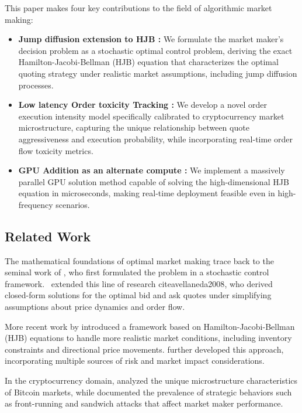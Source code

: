 \documentclass[twocolumn,11pt]{IEEEtran}  %
\begin{document}
This paper makes four key contributions to the field of algorithmic market making:

\begin{itemize}
    \item \textbf {Jump diffusion extension to HJB : } We formulate the market maker's decision problem as a stochastic optimal control problem, deriving the exact Hamilton-Jacobi-Bellman (HJB) equation that characterizes the optimal quoting strategy under realistic market assumptions, including jump diffusion processes.
    
    \item \textbf{Low latency Order toxicity Tracking : } We develop a novel order execution intensity model specifically calibrated to cryptocurrency market microstructure, capturing the unique relationship between quote aggressiveness and execution probability, while incorporating real-time order flow toxicity metrics.
    
    \item \textbf{ GPU Addition as an alternate compute : }We implement a massively parallel GPU solution method capable of solving the high-dimensional HJB equation in microseconds, making real-time deployment feasible even in high-frequency scenarios.
    
\end{itemize}

\subsection {Related Work}

The mathematical foundations of optimal market making trace back to the seminal work of \cite{ho1981optimal}, who first formulated the problem in a stochastic control framework. \ extended this line of research cite{avellaneda2008}, who derived closed-form solutions for the optimal bid and ask quotes under simplifying assumptions about price dynamics and order flow.

More recent work by \cite{gueant2013} introduced a framework based on Hamilton-Jacobi-Bellman (HJB) equations to handle more realistic market conditions, including inventory constraints and directional price movements. \cite{cartea2015} further developed this approach, incorporating multiple sources of risk and market impact considerations.

In the cryptocurrency domain, \cite{lehalle2019incorporating} analyzed the unique microstructure characteristics of Bitcoin markets, while \cite{daian2020flash} documented the prevalence of strategic behaviors such as front-running and sandwich attacks that affect market maker performance.
\end{document}

